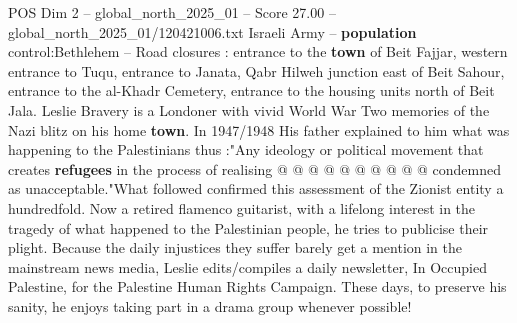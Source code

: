 \begin{textsample}{POS Dim 2 – global\_north\_2025\_01 – Score 27.00 – global\_north\_2025\_01/120421006.txt}
Israeli Army -- \textbf{population} control:Bethlehem -- Road closures : entrance to the \textbf{town} of Beit Fajjar, western entrance to Tuqu, entrance to Janata, Qabr Hilweh junction east of Beit Sahour, entrance to the al-Khadr Cemetery, entrance to the housing units north of Beit Jala.
Leslie Bravery is a Londoner with vivid World War Two memories of the Nazi blitz on his home \textbf{town}.
In 1947/1948 His father explained to him what was happening to the Palestinians thus :"Any ideology or political movement that creates \textbf{refugees} in the process of realising @ @ @ @ @ @ @ @ @ @ condemned as unacceptable."What followed confirmed this assessment of the Zionist entity a hundredfold.
Now a retired flamenco guitarist, with a lifelong interest in the tragedy of what happened to the Palestinian people, he tries to publicise their plight.
Because the daily injustices they suffer barely get a mention in the mainstream news media, Leslie edits/compiles a daily newsletter, In Occupied Palestine, for the Palestine Human Rights Campaign.
These days, to preserve his sanity, he enjoys taking part in a drama group whenever possible!

\end{textsample}
